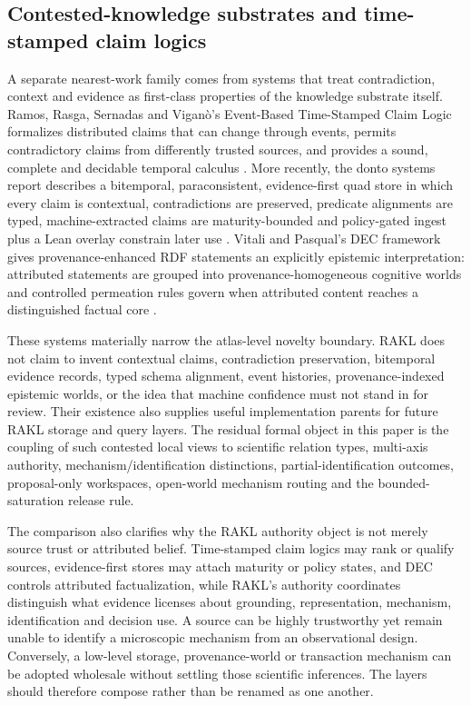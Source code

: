 \documentclass[11pt]{article}
\begin{document}
\subsection{Contested-knowledge substrates and time-stamped claim logics}

A separate nearest-work family comes from systems that treat contradiction, context and evidence as first-class properties of the knowledge substrate itself. Ramos, Rasga, Sernadas and Vigan\`o's Event-Based Time-Stamped Claim Logic formalizes distributed claims that can change through events, permits contradictory claims from differently trusted sources, and provides a sound, complete and decidable temporal calculus \cite{ramos2021eventclaim}. More recently, the donto systems report describes a bitemporal, paraconsistent, evidence-first quad store in which every claim is contextual, contradictions are preserved, predicate alignments are typed, machine-extracted claims are maturity-bounded and policy-gated ingest plus a Lean overlay constrain later use \cite{donto2026}. Vitali and Pasqual's DEC framework gives provenance-enhanced RDF statements an explicitly epistemic interpretation: attributed statements are grouped into provenance-homogeneous cognitive worlds and controlled permeation rules govern when attributed content reaches a distinguished factual core \cite{vitali2026dec}.

These systems materially narrow the atlas-level novelty boundary. RAKL does not claim to invent contextual claims, contradiction preservation, bitemporal evidence records, typed schema alignment, event histories, provenance-indexed epistemic worlds, or the idea that machine confidence must not stand in for review. Their existence also supplies useful implementation parents for future RAKL storage and query layers. The residual formal object in this paper is the coupling of such contested local views to scientific relation types, multi-axis authority, mechanism/identification distinctions, partial-identification outcomes, proposal-only workspaces, open-world mechanism routing and the bounded-saturation release rule.

The comparison also clarifies why the RAKL authority object is not merely source trust or attributed belief. Time-stamped claim logics may rank or qualify sources, evidence-first stores may attach maturity or policy states, and DEC controls attributed factualization, while RAKL's authority coordinates distinguish what evidence licenses about grounding, representation, mechanism, identification and decision use. A source can be highly trustworthy yet remain unable to identify a microscopic mechanism from an observational design. Conversely, a low-level storage, provenance-world or transaction mechanism can be adopted wholesale without settling those scientific inferences. The layers should therefore compose rather than be renamed as one another.
\end{document}
